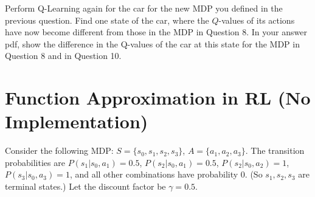 \documentclass{article}
\begin{document}
\begin{question}
 Perform Q-Learning again for the car for the new MDP you defined in the previous question. Find one state of the car, where the $Q$-values of its actions have now become different from those in the MDP in Question 8. In your answer pdf, show the difference in the Q-values of the car at this state for the MDP in Question 8 and in Question 10. 
\end{question}


\section{Function Approximation in RL (No Implementation)}

\begin{question}
Consider the following MDP: $S=\{s_0,s_1,s_2,s_3\}$, $A=\{a_1,a_2,a_3\}$. The transition probabilities are $P(s_1|s_0,a_1)=0.5$, $P(s_2|s_0,a_1)=0.5$, $P(s_2|s_0,a_2)=1$, $P(s_3|s_0,a_3)=1$, and all other combinations have probability 0. (So $s_1,s_2,s_3$ are terminal states.) Let the discount factor be $\gamma = 0.5$.


\end{question}
\end{document}
